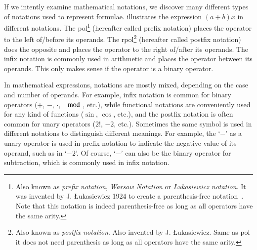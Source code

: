\documentclass[a4paper,11pt]{article}
\theoremstyle{defTheoStyle}
\theoremstyle{defExampStyle}
\begin{document}
If we intently examine mathematical notations, we discover many different types of notations used to represent formulae.  illustrates the expression $(a+b)x$ in different notations. The \gls*{pol}\footnote{Also known as \textit{prefix notation}, \textit{Warsaw Notation} or \textit{{\L}ukasiewicz notation}. It was invented by J. {\L}ukasiewicz 1924 to create a parenthesis-free notation~\parencite{Hamblin1962}. Note that this notation is indeed parenthesis-free as long as all operators have the same arity.} (hereafter called prefix notation) places the operator to the left of/before its operands. The \gls*{rpol}\footnote{Also known as \textit{postfix notation}. Also invented by J. {\L}ukasiewicz. Same as \gls*{pol} it does not need parenthesis as long as all operators have the same arity.} (hereafter called postfix notation) does the opposite and places the operator to the right of/after its operands. The infix notation is commonly used in arithmetic and places the operator between its operands. This only makes sense if the operator is a binary operator.

In mathematical expressions, notations are mostly mixed, depending on the case and number of operands. For example, infix notation is common for binary operators ($+$, $-$, $\cdot$, $\mod$, etc.), while functional notations are conveniently used for any kind of functions ($\sin$, $\cos$, etc.), and the postfix notation is often common for unary operators ($2!$, $-2$, etc.). Sometimes the same symbol is used in different notations to distinguish different meanings. For example, the `$-$' as a unary operator is used in prefix notation to indicate the negative value of its operand, such as in `$-2$'. Of course, `$-$' can also be the binary operator for subtraction, which is commonly used in infix notation. 
\end{document}
